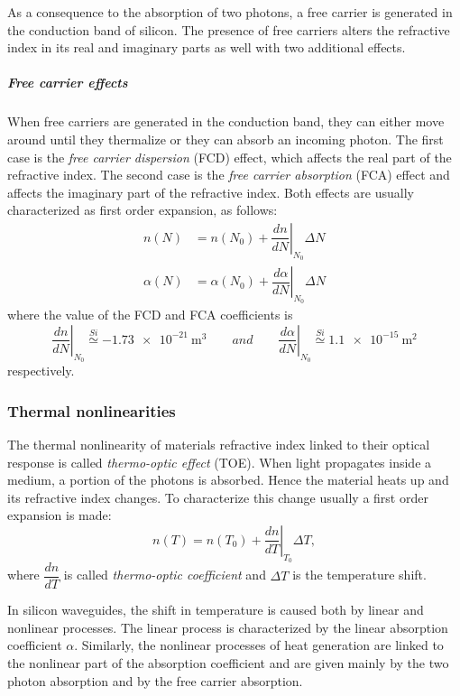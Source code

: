 As a consequence to the absorption of two photons, a free carrier is generated in the conduction band of silicon.
The presence of free carriers alters the refractive index in its real and imaginary parts as well with  two additional effects.

\subparagraph{Free carrier effects}
When free carriers are generated in the conduction band, they can either move around until they thermalize or they can absorb an incoming photon.
The first case is the \textit{free carrier dispersion} (FCD) effect, which affects the real part of the refractive index.
The second case is the \textit{free carrier absorption} (FCA) effect and affects the imaginary part of the refractive index.
Both effects are usually characterized as first order expansion, as follows:
\begin{align}
	n			\left(N	\right) &= n				\left(N_0\right) + \left.\dfrac{dn}{dN}\right|_{N_0} \Delta N \\
	\alpha	\left(N	\right) &= \alpha	\left(N_0\right) + \left.\dfrac{d\alpha}{dN}\right|_{N_0} \Delta N
\end{align}
where the value of the FCD and FCA coefficients is
\begin{equation}
	\left.\dfrac{dn}{dN}\right|_{N_0} \overset{Si}{\simeq} \SI{-1.73e-21}{\cubic\m}
	\qquad and \qquad
	\left.\dfrac{d\alpha}{dN}\right|_{N_0} \overset{Si}{\simeq} \SI{1.1e-15}{\square\m}
\end{equation}
respectively.

\subsubsection{Thermal nonlinearities}
\label{sssec:Thermal_nonlinearities}
The thermal nonlinearity of materials refractive index linked to their optical response is called \textit{thermo-optic effect} (TOE).
When light propagates inside a medium, a portion of the photons is absorbed.
Hence the material heats up and its refractive index changes.
To characterize this change usually a first order expansion is made:
\begin{equation}
	n\left(T\right) = n\left(T_0\right) + \left.\dfrac{dn}{dT}\right|_{T_0} \Delta T,
	\label{eq:TOC}
\end{equation}
where $\dfrac{dn}{dT}$ is called \textit{thermo-optic coefficient} and $\Delta T$ is the temperature shift.

In silicon waveguides, the shift in temperature is caused both by linear and nonlinear processes.
The linear process is characterized by the linear absorption coefficient $\alpha$.
Similarly, the nonlinear processes of heat generation are linked to the nonlinear part of the absorption coefficient and are given mainly by the two photon absorption and by the free carrier absorption.

